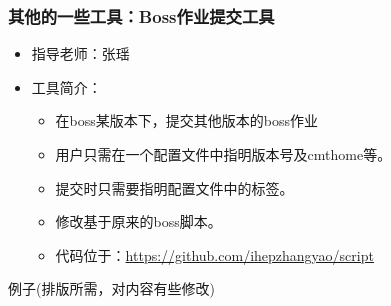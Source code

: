 \begin{frame}
    \frametitle{其他的一些工具：Boss作业提交工具}
    \begin{itemize}
        \item 指导老师：张瑶
        \item 工具简介：
            \begin{itemize}
                \item 在boss某版本下，提交其他版本的boss作业
                \item 用户只需在一个配置文件中指明版本号及cmthome等。
                \item 提交时只需要指明配置文件中的标签。
                \item 修改基于原来的boss脚本。
                \item 代码位于：\url{https://github.com/ihepzhangyao/script}
            \end{itemize}
    \end{itemize}
    \begin{block}{例子(排版所需，对内容有些修改)}
        \par\usebox{\ZhangYaoBossScript}
    \end{block}
\end{frame}
